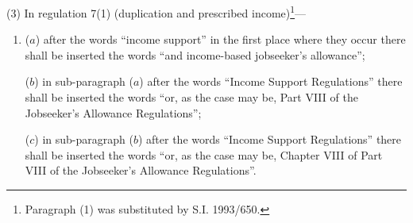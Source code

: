 \documentclass[a4paper]{article}
\begin{document}
(3) In regulation 7(1) (duplication and prescribed income)\footnote{\frenchspacing Paragraph (1) was substituted by S.I. 1993/650.}—
\begin{enumerate}\item[]
($a$) after the words “income support” in the first place where they occur there shall be inserted the words “and income-based jobseeker’s allowance”;

($b$) in sub-paragraph ($a$) after the words “Income Support Regulations” there shall be inserted the words “or, as the case may be, Part VIII of the Jobseeker’s Allowance Regulations”;

($c$) in sub-paragraph ($b$) after the words “Income Support Regulations” there shall be inserted the words “or, as the case may be, Chapter VIII of Part VIII of the Jobseeker’s Allowance Regulations”.
\end{enumerate}
\end{document}
